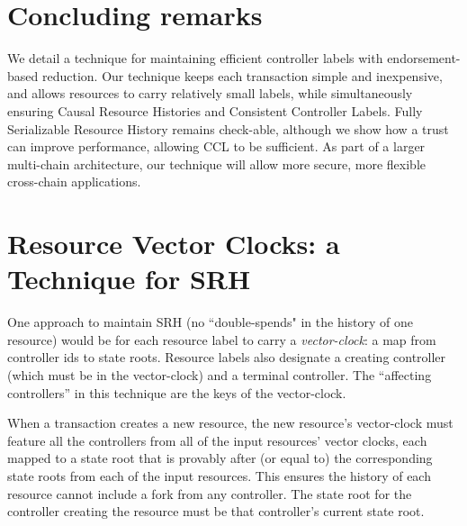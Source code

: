 \documentclass[a4paper,USenglish,cleveref, autoref, thm-restate, anonymous]{lipics-v2021}
\begin{document}


 
\section{Concluding remarks}
We detail a technique for maintaining efficient controller labels with endorsement-based reduction.
Our technique keeps each transaction simple and inexpensive, and allows resources to carry relatively small labels, while simultaneously ensuring Causal Resource Histories and Consistent Controller Labels.
Fully Serializable Resource History remains check-able, although we show how a trust can improve performance, allowing CCL to be sufficient.
As part of a larger multi-chain architecture, our technique will allow more secure, more flexible cross-chain applications.






\appendix


\section{Resource Vector Clocks: a Technique for SRH}
\label{sec:resourcevectorclocks}
One approach to maintain SRH (no ``double-spends" in the history of one resource) would be for each resource label to carry a \textit{vector-clock}: a map from controller ids to state roots. 
Resource labels also designate a creating controller (which must be in the vector-clock) and a terminal controller.
The ``affecting controllers'' in this technique are the keys of the vector-clock.

When a transaction creates a new resource, the new resource's vector-clock must feature all the controllers from all of the input resources' vector clocks, each mapped to a state root that is provably after (or equal to) the corresponding state roots from each of the input resources. 
This ensures the history of each resource cannot include a fork from any controller. 
The state root for the controller creating the resource must be that controller's current state root. 
\end{document}

